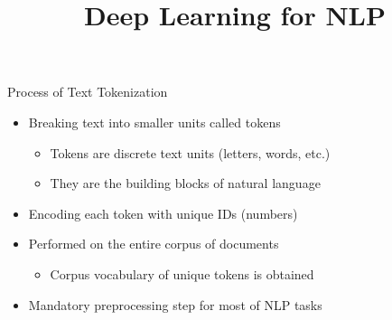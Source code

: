 \documentclass[11pt,compress,t,notes=noshow, xcolor=table]{beamer}
\title{Deep Learning for NLP}
\begin{document}


\begin{vbframe}{Process of Text Tokenization}

\vfill

\begin{itemize}
	\item Breaking text into smaller units called tokens
		\begin{itemize}
			\item Tokens are discrete text units (letters, words, etc.)
			\item They are the building blocks of natural language
		\end{itemize}
	\item Encoding each token with unique IDs (numbers)
	\item Performed on the entire corpus of documents
		\begin{itemize}
			\item Corpus vocabulary of unique tokens is obtained
		\end{itemize}
	\item Mandatory preprocessing step for most of NLP tasks

\end{itemize}

\vfill

\end{vbframe}

\end{document}
